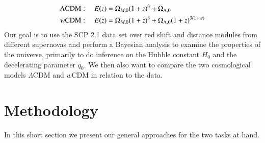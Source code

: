 \documentclass[11pt,a4paper]{article}
\begin{document}
\begin{align}
    \label{eq:lambda_model}
    \Lambda\text{CDM}: \hspace{10px} E(z) &= \Omega_{M,0}(1+z)^3 + \Omega_{\Lambda,0} \\
    \label{eq:omega_model}
    w\text{CDM}: \hspace{10px} E(z) &= \Omega_{M,0}(1+z)^3 + \Omega_{\Lambda,0}(1+z)^{3(1+w)} 
\end{align}
Our goal is to use the SCP 2.1 data set over red shift and distance modules from different supernovas and perform a Bayesian analysis to examine the properties of the universe, primarily to do inference on the Hubble constant $H_0$ and the decelerating parameter $q_0$. We then also want to compare the two cosmological models $\Lambda$CDM and $w$CDM in relation to the data.

 
\section{Methodology}
In this short section we present our general approaches for the two tasks at hand.
\end{document}

